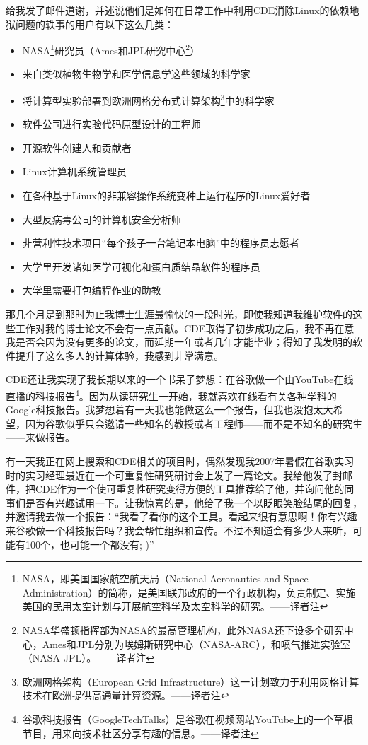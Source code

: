 \documentclass[letter,12pt]{book}
\begin{document}
\begin{CJK}{UTF8}{gbsn}
给我发了邮件道谢，并述说他们是如何在日常工作中利用CDE消除Linux的依赖地狱问题的轶事的用户有以下这么几类：
\begin{itemize}
  \item NASA\footnote{NASA，即美国国家航空航天局（National Aeronautics and Space Administration）的简称，是美国联邦政府的一个行政机构，负责制定、实施美国的民用太空计划与开展航空科学及太空科学的研究。——译者注}研究员（Ames和JPL研究中心\footnote{NASA华盛顿指挥部为NASA的最高管理机构，此外NASA还下设多个研究中心，Ames和JPL分别为埃姆斯研究中心（NASA-ARC），和喷气推进实验室（NASA-JPL）。——译者注}）
  \item 来自类似植物生物学和医学信息学这些领域的科学家
  \item 将计算型实验部署到欧洲网格分布式计算架构\footnote{欧洲网格架构（European Grid Infrastructure）这一计划致力于利用网格计算技术在欧洲提供高通量计算资源。——译者注}中的科学家
  \item 软件公司进行实验代码原型设计的工程师
  \item 开源软件创建人和贡献者
  \item Linux计算机系统管理员
  \item 在各种基于Linux的非兼容操作系统变种上运行程序的Linux爱好者
  \item 大型反病毒公司的计算机安全分析师
  \item 非营利性技术项目“每个孩子一台笔记本电脑”中的程序员志愿者
  \item 大学里开发诸如医学可视化和蛋白质结晶软件的程序员
  \item 大学里需要打包编程作业的助教
\end{itemize}
那几个月是到那时为止我博士生涯最愉快的一段时光，即使我知道我维护软件的这些工作对我的博士论文不会有一点贡献。CDE取得了初步成功之后，我不再在意我是否会因为没有更多的论文，而延期一年或者几年才能毕业；得知了我发明的软件提升了这么多人的计算体验，我感到非常满意。

\breakline

CDE还让我实现了我长期以来的一个书呆子梦想：在谷歌做一个由YouTube在线直播的科技报告\footnote{谷歌科技报告（GoogleTechTalks）是谷歌在视频网站YouTube上的一个草根节目，用来向技术社区分享有趣的信息。——译者注}。因为从读研究生一开始，我就喜欢在线看有关各种学科的Google科技报告。我梦想着有一天我也能做这么一个报告，但我也没抱太大希望，因为谷歌似乎只会邀请一些知名的教授或者工程师——而不是不知名的研究生——来做报告。

有一天我正在网上搜索和CDE相关的项目时，偶然发现我2007年暑假在谷歌实习时的实习经理最近在一个可重复性研究研讨会上发了一篇论文。我给他发了封邮件，把CDE作为一个使可重复性研究变得方便的工具推荐给了他，并询问他的同事们是否有兴趣试用一下。让我惊喜的是，他给了我一个以眨眼笑脸结尾的回复，并邀请我去做一个报告：“我看了看你的这个工具。看起来很有意思啊！你有兴趣来谷歌做一个科技报告吗？我会帮忙组织和宣传。不过不知道会有多少人来听，可能有100个，也可能一个都没有;-)”


\end{CJK}
\end{document}
